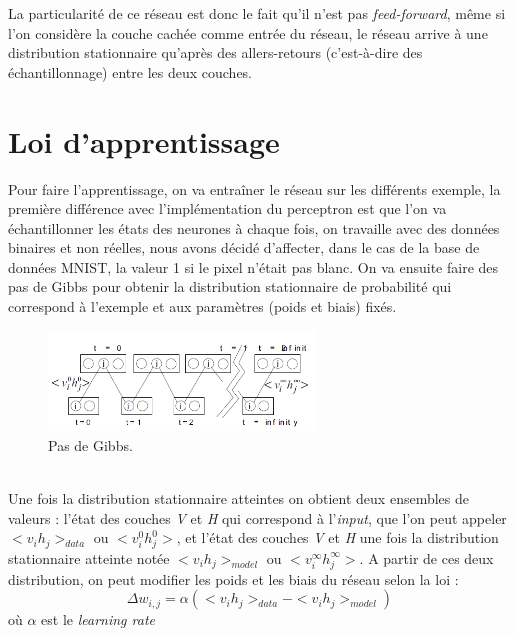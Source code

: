 \documentclass[a4paper,oneside]{report}
\begin{document}
 La particularité de ce réseau est donc le fait qu'il n'est pas
                \textit{feed-forward}, même si l'on considère la couche cachée comme entrée du
               réseau, le réseau arrive à une distribution stationnaire qu'après des allers-retours (c'est-à-dire des échantillonnage) entre
les deux couches.

\section{Loi d'apprentissage}

Pour faire l'apprentissage, on va entraîner le réseau sur les différents exemple, la première différence avec l'implémentation du perceptron est
que l'on va  échantillonner les états des neurones à chaque fois, on travaille avec des données binaires et non réelles, nous avons décidé 
d'affecter, dans le cas de la base de données MNIST, la valeur 1 si le pixel n'était pas blanc.
On va ensuite faire des pas de Gibbs pour obtenir la distribution stationnaire de probabilité
 qui correspond à l'exemple et aux paramètres (poids et biais) fixés.
\begin{figure}[!h]
                    \begin{center}
                        \includegraphics[width=200pt]{Images/Gibbs.png}
                    \end{center}
                    \caption{Pas de Gibbs.}
\end{figure}\\

Une fois la distribution stationnaire atteintes on obtient deux ensembles de valeurs : l'état des couches \textit{V} et  \textit{H}
qui correspond à l'\textit{input}, que l'on peut appeler \begin{math}<v_{i}h_{j}>_{data}\end{math} ou \begin{math}<v_{i}^{0}h_{j}^{0}>\end{math}, et l'état des couches \textit{V} et  \textit{H} une fois la distribution stationnaire atteinte notée \begin{math}<v_{i}h_{j}>_{model}\end{math} ou \begin{math}<v_{i}^{\infty}h_{j}^{\infty}>\end{math}. A partir de ces deux distribution, on peut modifier les poids et les biais du réseau selon la loi :
                \begin{equation}
                    \Delta w_{i,j} = \alpha (<v_{i}h_{j}>_{data} - <v_{i}h_{j}>_{model} )
                \end{equation}
                où \begin{math}\alpha\end{math} est le \textit{learning rate}\\
\end{document}

